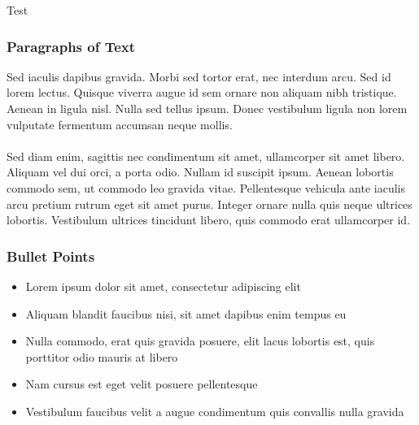 \documentclass{beamer}
\begin{document}

\iffalse
\begin{frame}
{Test}
\end{frame}


\begin{frame}
\frametitle{Paragraphs of Text}
Sed iaculis dapibus gravida. Morbi sed tortor erat, nec interdum arcu. Sed id lorem lectus. Quisque viverra augue id sem ornare non aliquam nibh tristique. Aenean in ligula nisl. Nulla sed tellus ipsum. Donec vestibulum ligula non lorem vulputate fermentum accumsan neque mollis.\\~\\

Sed diam enim, sagittis nec condimentum sit amet, ullamcorper sit amet libero. Aliquam vel dui orci, a porta odio. Nullam id suscipit ipsum. Aenean lobortis commodo sem, ut commodo leo gravida vitae. Pellentesque vehicula ante iaculis arcu pretium rutrum eget sit amet purus. Integer ornare nulla quis neque ultrices lobortis. Vestibulum ultrices tincidunt libero, quis commodo erat ullamcorper id.
\end{frame}


\begin{frame}
\frametitle{Bullet Points}
\begin{itemize}
\item Lorem ipsum dolor sit amet, consectetur adipiscing elit
\item Aliquam blandit faucibus nisi, sit amet dapibus enim tempus eu
\item Nulla commodo, erat quis gravida posuere, elit lacus lobortis est, quis porttitor odio mauris at libero
\item Nam cursus est eget velit posuere pellentesque
\item Vestibulum faucibus velit a augue condimentum quis convallis nulla gravida
\end{itemize}
\end{frame}

\end{document}
